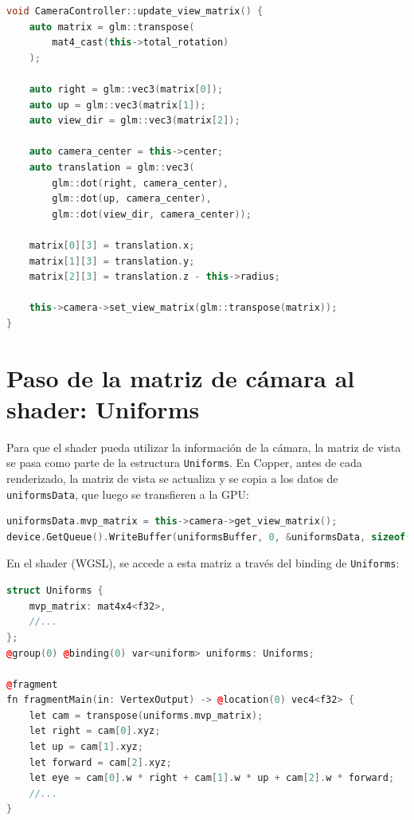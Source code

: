 \begin{lstlisting}[language=C++,caption={Actualización de la vista desde CameraController}]
void CameraController::update_view_matrix() {
    auto matrix = glm::transpose(
        mat4_cast(this->total_rotation)
    );

    auto right = glm::vec3(matrix[0]);
    auto up = glm::vec3(matrix[1]);
    auto view_dir = glm::vec3(matrix[2]);

    auto camera_center = this->center;
    auto translation = glm::vec3(
        glm::dot(right, camera_center),
        glm::dot(up, camera_center),
        glm::dot(view_dir, camera_center));

    matrix[0][3] = translation.x;
    matrix[1][3] = translation.y;
    matrix[2][3] = translation.z - this->radius;

    this->camera->set_view_matrix(glm::transpose(matrix));
}
\end{lstlisting}

\section{Paso de la matriz de cámara al shader: Uniforms}

Para que el shader pueda utilizar la información de la cámara, la matriz de
vista se pasa como parte de la estructura \texttt{Uniforms}. En Copper, antes
de cada renderizado, la matriz de vista se actualiza y se copia a los datos de
\texttt{uniformsData}, que luego se transfieren a la GPU:

\begin{lstlisting}[language=C++,caption={Actualización del uniform con la matriz de vista}]
uniformsData.mvp_matrix = this->camera->get_view_matrix();
device.GetQueue().WriteBuffer(uniformsBuffer, 0, &uniformsData, sizeof(Uniforms));
\end{lstlisting}

En el shader (WGSL), se accede a esta matriz a través del binding de
\texttt{Uniforms}:

\begin{lstlisting}[language=C++,caption={Uso de la matriz de cámara en el shader}]
struct Uniforms {
    mvp_matrix: mat4x4<f32>,
    //...
};
@group(0) @binding(0) var<uniform> uniforms: Uniforms;

@fragment
fn fragmentMain(in: VertexOutput) -> @location(0) vec4<f32> {
    let cam = transpose(uniforms.mvp_matrix);
    let right = cam[0].xyz;
    let up = cam[1].xyz;
    let forward = cam[2].xyz;
    let eye = cam[0].w * right + cam[1].w * up + cam[2].w * forward;
    //...
}
\end{lstlisting}

